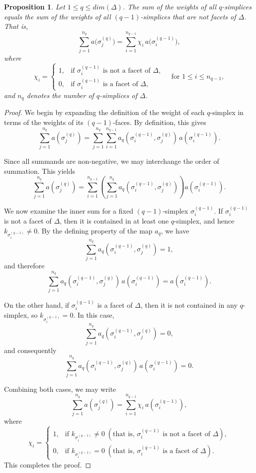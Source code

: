 \documentclass[12pt]{article}
\theoremstyle{normalhead_nobrackets}
\newtheorem{proposition}[theorem]{Proposition}
\theoremstyle{exampstyle}
\begin{document}
\begin{proposition}\label{1prop:weight-compare}
Let $1 \le q \le dim(\Delta)$. The sum of the weights of all $q$-simplices equals the sum of the weights of all $(q-1)$-simplices that are not facets of $\Delta$. That is,
\begin{equation}\label{1eq:weight-compare}
\sum_{j=1}^{n_q} a\bigl(\sigma_j^{(q)}\bigr)
=
\sum_{i=1}^{n_{q-1}} \chi_i \, a\bigl(\sigma_i^{(q-1)}\bigr),
\end{equation}
where
\[
\chi_i =
\begin{cases}
1, & \text{if } \sigma_i^{(q-1)} \text{ is not a facet of } \Delta, \\[6pt]
0, & \text{if } \sigma_i^{(q-1)} \text{ is a facet of } \Delta,
\end{cases}
\quad \text{for } 1 \le i \le n_{q-1},
\]
and $n_q$ denotes the number of $q$-simplices of $\Delta$.
\end{proposition}

\begin{proof}
We begin by expanding the definition of the weight of each $q$-simplex in terms of the weights of its $(q-1)$-faces. By definition, this gives
\[
\sum_{j=1}^{n_q} a(\sigma_j^{(q)}) 
=
\sum_{j=1}^{n_q} \sum_{i=1}^{n_{q-1}} 
a_q(\sigma_i^{(q-1)}, \sigma_j^{(q)}) \, a(\sigma_i^{(q-1)}).
\]

Since all summands are non-negative, we may interchange the order of summation. This yields
\[
\sum_{j=1}^{n_q} a(\sigma_j^{(q)}) 
=
\sum_{i=1}^{n_{q-1}} 
\left(
\sum_{j=1}^{n_q} 
a_q(\sigma_i^{(q-1)}, \sigma_j^{(q)})
\right)
a(\sigma_i^{(q-1)}).
\]

We now examine the inner sum for a fixed $(q-1)$-simplex $\sigma_i^{(q-1)}$. If $\sigma_i^{(q-1)}$ is not a facet of $\Delta$, then it is contained in at least one $q$-simplex, and hence $k_{\sigma_i^{(q-1)}} \neq 0$. By the defining property of the map $a_q$, we have
\[
\sum_{j=1}^{n_q} 
a_q(\sigma_i^{(q-1)}, \sigma_j^{(q)}) = 1,
\]
and therefore
\[
\sum_{j=1}^{n_q} 
a_q(\sigma_i^{(q-1)}, \sigma_j^{(q)}) \, a(\sigma_i^{(q-1)})
=
a(\sigma_i^{(q-1)}).
\]

On the other hand, if $\sigma_i^{(q-1)}$ is a facet of $\Delta$, then it is not contained in any $q$-simplex, so $k_{\sigma_i^{(q-1)}} = 0$. In this case,
\[
\sum_{j=1}^{n_q} 
a_q(\sigma_i^{(q-1)}, \sigma_j^{(q)}) = 0,
\]
and consequently
\[
\sum_{j=1}^{n_q} 
a_q(\sigma_i^{(q-1)}, \sigma_j^{(q)}) \, a(\sigma_i^{(q-1)}) = 0.
\]

Combining both cases, we may write
\[
\sum_{j=1}^{n_q} a(\sigma_j^{(q)}) 
=
\sum_{i=1}^{n_{q-1}} \chi_i \, a(\sigma_i^{(q-1)}),
\]
where
\[
\chi_i =
\begin{cases}
1, & \text{if } k_{\sigma_i^{(q-1)}} \neq 0 \; (\text{that is, } \sigma_i^{(q-1)} \text{ is not a facet of } \Delta), \\[6pt]
0, & \text{if } k_{\sigma_i^{(q-1)}} = 0 \; (\text{that is, } \sigma_i^{(q-1)} \text{ is a facet of } \Delta).
\end{cases}
\]
This completes the proof.
\end{proof}
\end{document}
